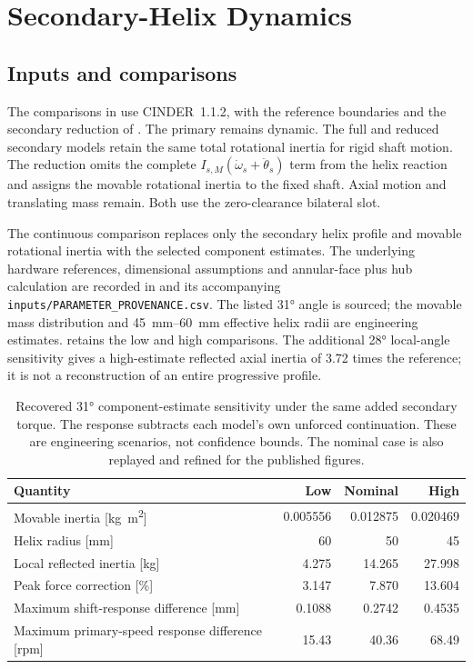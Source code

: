 \documentclass[11pt]{report}
\numberwithin{equation}{section}
\newcounter{assump}
\begin{document}
\section{Secondary-Helix Dynamics}
\label{app:study_secondary_dynamics}

\subsection{Inputs and comparisons}

The comparisons in  use CINDER~1.1.2,
with the reference boundaries and the secondary reduction of
. The primary remains dynamic.
The full and reduced secondary models retain the same total rotational
inertia for rigid shaft motion. The reduction omits the complete
\(I_{s,M}(\dot\omega_s+\ddot\theta_s)\) term from the helix reaction and
assigns the movable rotational inertia to the fixed shaft. Axial motion and
translating mass remain. Both use the zero-clearance bilateral slot.

The continuous comparison replaces only the secondary helix profile and
movable rotational inertia with the selected component estimates. The
underlying hardware references, dimensional assumptions and annular-face
plus hub calculation are recorded in
and its accompanying \texttt{inputs/PARAMETER\_PROVENANCE.csv}.
The listed \ang{31} angle is sourced; the movable mass distribution and
\SIrange{45}{60}{mm} effective helix radii are engineering estimates.
 retains the low and high comparisons.
The additional \ang{28} local-angle sensitivity gives a high-estimate
reflected axial inertia of \num{3.72} times the reference; it is not a
reconstruction of an entire progressive profile.

\begin{table}[H]
 \centering\small
 \begin{tabular}{@{}lrrr@{}}
 \toprule
 Quantity & Low & Nominal & High \\
 \midrule
 Movable inertia [\si{kg.m^2}] & 0.005556 & 0.012875 & 0.020469 \\
 Helix radius [mm] & 60 & 50 & 45 \\
 Local reflected inertia [kg] & 4.275 & 14.265 & 27.998 \\
 Peak force correction [\%] & 3.147 & 7.870 & 13.604 \\
 Maximum shift-response difference [mm] & 0.1088 & 0.2742 & 0.4535 \\
 Maximum primary-speed response difference [rpm] & 15.43 & 40.36 & 68.49 \\
 \bottomrule
 \end{tabular}
 \caption{Recovered \ang{31} component-estimate sensitivity under the same
 added secondary torque. The response subtracts each model's own unforced
 continuation. These are engineering scenarios, not confidence bounds.
 The nominal case is also replayed and refined for the published figures.}
 \label{tab:secondary_estimate_range}
\end{table}
\end{document}
